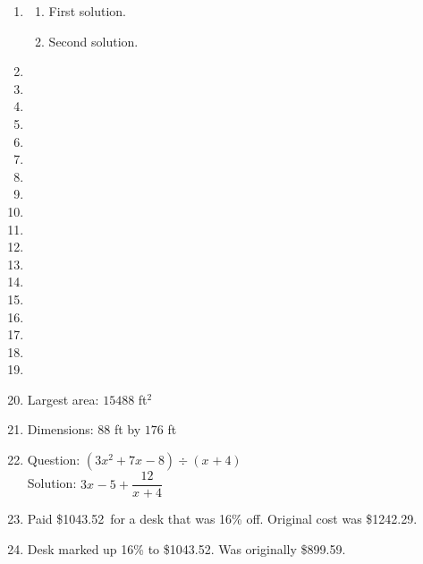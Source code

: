 \documentclass[12pt]{amsart}
\begin{document}
\begin{enumerate}
\item \begin{enumerate}
\item First solution.
\item Second solution.
\end{enumerate}
 \item   \item   \item   \item   \item   \item   \item   \item   \item   \item   \item   \item   \item   \item  \item   \item   \item   \item  \def \x{88}\def \y{176}\def \L{352}\def \area{15488} 
\item  Largest area: $\area$ ft$^2$
 
\item  Dimensions: $\x$ ft by $\y$ ft
\def \a{4}\def \b{3}\def \c{-5}\def \r{12}\def \monicpol{x^{}+4}\def \longnbad{3x^{2}+7x^{}-8}\def \anspol{3x^{}-5}
\item Question: $(\longnbad) \div (\monicpol)$   \\
Solution: $\anspol + \dfrac{\r}{\monicpol}$
\def \discount{16}\def \paid{1043.52}\def \rainy{14.27}\def \orcost{1242.29}\def \purcost{899.59}\def \orrainy{16.99}
\item Paid \$\paid\ for a desk that was \discount\% off. Original cost was \$\orcost. 

\item Desk marked up \discount\% to \$\paid. Was originally \$\purcost. 


\end{enumerate}
\end{document}
